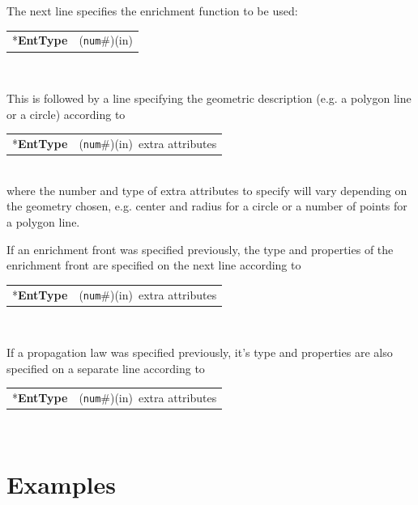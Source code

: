 \documentclass[a4paper]{article}
\makeatletter
\newcommand{\param}[1]{\texttt{#1}} %
\newcommand{\componentNum}{(\param{num}\#){\tiny(in)}} %
\newcommand{\entKeyword}[1]{*\textbf{#1}} %
\newenvironment{record}[1][]{\begin{tabular}{|ll}}{\end{tabular}\\}
\newcommand{\recentry}[2]{{#1}&{#2}\\}
\newcounter{rcc}
\newenvironment{record}[1][\textwidth]{\setcounter{rcc}{0}\begin{tabular*}{#1}{|ll@{\extracolsep{\fill}}r}}{\end{tabular*}\\}
\newcommand{\recentry}[2]{\ifthenelse{\value{rcc}>0}{&$\backslash$ \\}{\setcounter{rcc}{1}}{#1}&{#2}}
\makeatother
\begin{document}
The next line specifies the enrichment function to be used:\\
\noindent
\begin{record}
  \recentry{\entKeyword{EntType}}{\componentNum}
\end{record}

This is followed by a line specifying the geometric description (e.g. a polygon
line or a circle) according to\\
\noindent
\begin{record}
  \recentry{\entKeyword{EntType}}{\componentNum \ extra attributes}
\end{record}
where the number and type of extra attributes to specify will vary depending on the
geometry chosen, e.g. center and radius for a circle or a number of points for a
polygon line.

If an enrichment front was specified previously, the type and properties of the
enrichment front are specified on the next line according to\\
\noindent
\begin{record}
  \recentry{\entKeyword{EntType}}{\componentNum \ extra attributes}
\end{record}

If a propagation law was specified previously, it's type and properties are also
specified on a separate line according to\\
\noindent
\begin{record}
  \recentry{\entKeyword{EntType}}{\componentNum \ extra attributes}
\end{record}


\section{Examples}
\end{document}
